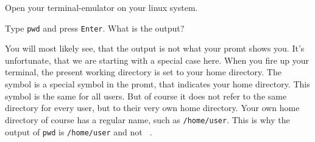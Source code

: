 \begin{challenge}
    \begin{task}
    Open your terminal-emulator on your linux system.
        \begin{questions}
            \item Type \texttt{pwd} and press \texttt{Enter}. What is the output?
        \end{questions}
    You will most likely see, that the output is not what your promt shows you. 
    It's unfortunate, that we are starting with a special case here.
    When you fire up your terminal, the present working directory is set to your home directory.
    The \texttt{~} symbol is a special symbol in the promt, that indicates your home directory.
    This symbol is the same for all users. 
    But of course it does not refer to the same directory for every user, but to their very own home directory.
    Your own home directory of course has a regular name, such as \texttt{/home/user}.
    This is why the output of \texttt{pwd} is \texttt{/home/user} and not \texttt{~}.
    \end{task}


\end{challenge}

